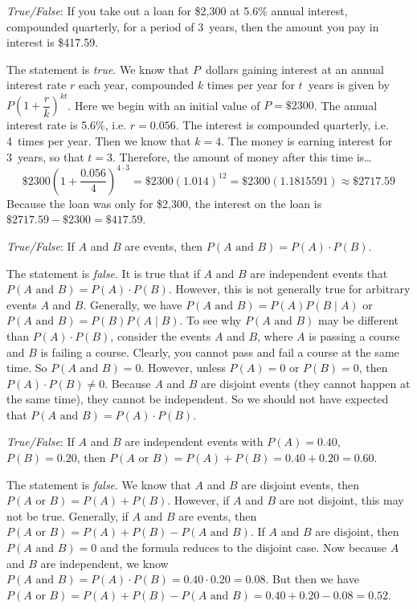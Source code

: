 \documentclass[11pt,letterpaper]{article}
\begin{document}
\quizsol \textit{True/False}: If you take out a loan for \$2,300 at 5.6\% annual interest, compounded quarterly, for a period of 3~years, then the amount you pay in interest is \$417.59. \pspace

\sol The statement is \textit{true}. We know that $P$~dollars gaining interest at an annual interest rate $r$ each year, compounded $k$ times per year for $t$~years is given by $P \left(1 + \dfrac{r}{k} \right)^{kt}$. Here we begin with an initial value of $P= \$2300$. The annual interest rate is 5.6\%, i.e. $r= 0.056$. The interest is compounded quarterly, i.e. 4~times per year. Then we know that $k= 4$. The money is earning interest for 3~years, so that $t= 3$. Therefore, the amount of money after this time is\dots
	\[
	\$2300 \left(1 + \dfrac{0.056}{4} \right)^{4 \cdot 3}= \$2300 \left(1.014 \right)^{12}= \$2300(1.1815591) \approx \$2717.59
	\]
Because the loan was only for \$2,300, the interest on the loan is $\$2717.59 - \$2300= \$417.59$. \pvspace{1.5cm}



\quizsol \textit{True/False}: If $A$ and $B$ are events, then $P(A \text{ and } B)= P(A) \cdot P(B)$. \pspace

\sol The statement is \textit{false}. It is true that if $A$ and $B$ are independent events that $P(A \text{ and } B)= P(A) \cdot P(B)$. However, this is not generally true for arbitrary events $A$ and $B$. Generally, we have $P(A \text{ and } B)= P(A) P(B \;|\; A)$ or $P(A \text{ and } B)= P(B) P(A \;|\; B)$. To see why $P(A \text{ and } B)$ may be different than $P(A) \cdot P(B)$, consider the events $A$ and $B$, where $A$ is passing a course and $B$ is failing a course. Clearly, you cannot pass and fail a course at the same time. So $P(A \text{ and } B)= 0$. However, unless $P(A)= 0$ or $P(B)= 0$, then $P(A) \cdot P(B) \neq 0$. Because $A$ and $B$ are disjoint events (they cannot happen at the same time), they cannot be independent. So we should not have expected that $P(A \text{ and } B)= P(A) \cdot P(B)$.  



\newpage



\quizsol \textit{True/False}: If $A$ and $B$ are independent events with $P(A)= 0.40$, $P(B)= 0.20$, then $P(A \text{ or } B)= P(A) + P(B)= 0.40 + 0.20= 0.60$. \pspace

\sol The statement is \textit{false}. We know that $A$ and $B$ are disjoint events, then $P(A \text{ or } B)= P(A) + P(B)$. However, if $A$ and $B$ are not disjoint, this may not be true. Generally, if $A$ and $B$ are events, then $P(A \text{ or } B)= P(A) + P(B) - P(A \text{ and } B)$. If $A$ and $B$ are disjoint, then $P(A \text{ and } B)= 0$ and the formula reduces to the disjoint case. Now because $A$ and $B$ are independent, we know $P(A \text{ and } B)= P(A) \cdot P(B)= 0.40 \cdot 0.20= 0.08$. But then we have $P(A \text{ or } B)= P(A) + P(B) - P(A \text{ and } B)= 0.40 + 0.20 - 0.08= 0.52$. \pvspace{1.6cm}
\end{document}
